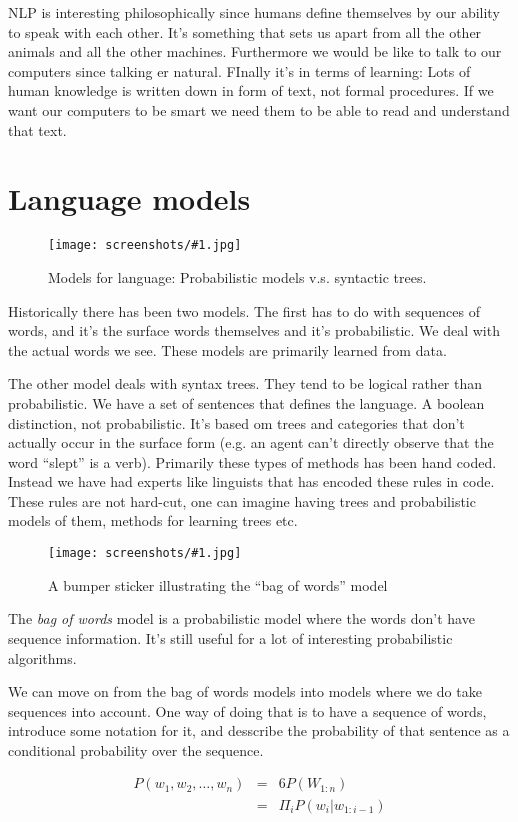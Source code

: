 \documentclass[a4, 12pt, english, USenglish]{scrreprt}
\newcommand{\screenshot}[2]{
\begin{figure}[htb]
\texttt{[image: screenshots/\#1.jpg]}
\label{#1}
\caption{#2}
\end{figure}}
\newcommand{\idx}[1]{{\em #1}\index{#1}}
\begin{document}
NLP is interesting philosophically since humans define themselves by
our ability to speak with each other.  It's something that sets us
apart from all the other animals and all the other machines.
Furthermore we would be like to talk to our computers since talking er
natural.  FInally it's in terms of learning: Lots of human knowledge
is written down in form of text, not formal procedures.  If we want
our computers to be smart we need them to be able to read and
understand that text.

\section{Language models}

\screenshot{languagemodels}{Models for language: Probabilistic models
  v.s. syntactic trees.}

Historically there has been two models.   The first has to do with
sequences of words, and it's the surface words themselves and it's
probabilistic.  We deal with the actual words we see.  These models
are primarily learned from data.

The other model deals with syntax trees.  They tend to be logical
rather than probabilistic.  We have a set of sentences that defines
the language.  A boolean distinction, not probabilistic.  It's based
om trees and categories that don't actually occur in the surface form
(e.g. an agent can't directly observe that the word ``slept'' is a
verb).  Primarily these types of methods has been hand coded. Instead
we have had experts like linguists that has encoded these rules in
code.   These rules are not hard-cut, one can imagine having trees and
probabilistic models of them,  methods for learning trees etc.

\screenshot{bagofwordsmodel}{A bumper sticker illustrating the ``bag
  of words'' model}

The \idx{bag of words} model is a probabilistic model where the words
don't have sequence information.  It's still useful for a lot of
interesting probabilistic algorithms.

We can move on from the bag of words models into models where we do
take sequences into account.   One way of doing that is to have a
sequence of words, introduce some notation for it, and desscribe the
probability of that sentence as a conditional probability over the sequence.

\[
\begin{array}{lcl}
   P(w_1,  w_2, \ldots, w_n) &=&6 P(W_{1:n}) \\
    &=& \Pi_i P(w_i | w_{1:i-1}) 
\end{array}
\]
\end{document}
